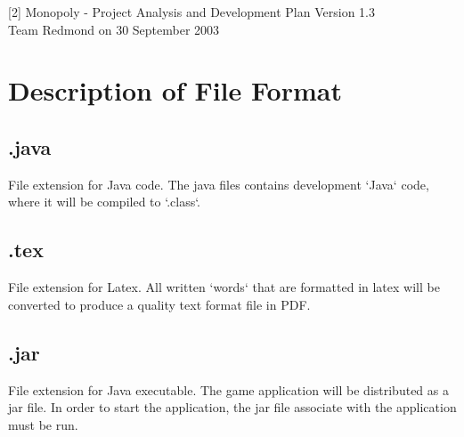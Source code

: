 \documentclass[12pt]{article}
\begin{document}
[2] Monopoly - Project Analysis and Development Plan Version 1.3 \\
Team Redmond on 30 September 2003\\

\setlength{\parindent}{10ex}

\newpage

\section{Description of File Format}

\subsection{.java}
File extension for Java code. The java files contains development `Java` code, where it will be compiled to `.class`.
\subsection{.tex}
File extension for Latex. All written `words` that are formatted in latex will be converted to produce a quality text format file in PDF.
\subsection{.jar}
File extension for Java executable. The game application will be distributed as a jar file. In order to start the application, the jar file associate with the application must be run.
\end{document}

